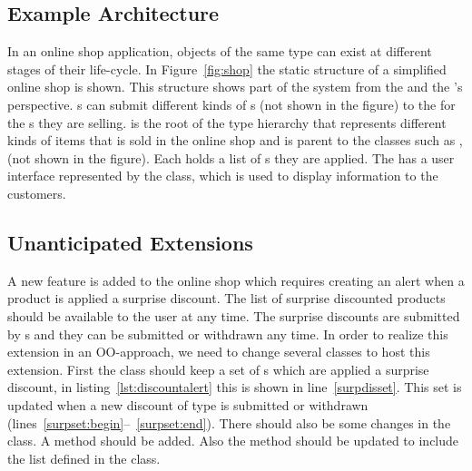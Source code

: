 \subsection{Example Architecture}
In an online shop application, objects of the same type can exist at different stages of their life-cycle. In Figure~\ref{fig:shop} the static structure of a simplified online shop is shown. This structure shows part of the system from the  and the 's perspective. s can submit different kinds of s (not shown in the figure) to the  for the s they are selling.  is the root of the type hierarchy that represents different kinds of items that is sold in the online shop and is parent to the classes such as ,  (not shown in the figure). Each  holds a list of s they are applied. The  has a user interface represented by the  class, which is used to display information to the customers. 


\subsection{Unanticipated Extensions}
A new feature is added to the online shop which requires creating an alert when a product is applied a surprise discount. The list of surprise discounted products should be available to the user at any time. The surprise discounts are submitted by s and they can be submitted or withdrawn any time.  In order to realize this extension in an OO-approach, we need to change several classes to host this extension. First the class  should keep a set of s which are applied a surprise discount, in listing~\ref{lst:discountalert} this is shown in line~\ref{surpdisset}. This set is updated when a new discount of type  is submitted or withdrawn (lines~\ref{surpset:begin}--~\ref{surpset:end}). There should also be some changes in the  class. A  method should be added. Also the  method should be updated to include the  list defined in the  class.


